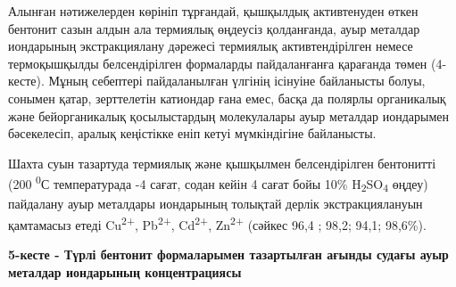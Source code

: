 Алынған нәтижелерден көрініп тұрғандай, қышқылдық активтенуден өткен
бентонит сазын алдын ала термиялық өңдеусіз қолданғанда, ауыр металдар
иондарының экстракциялану дәрежесі термиялық активтендірілген немесе
термоқышқылды белсендірілген формаларды пайдаланғанға қарағанда төмен
(4-кесте). Мұның себептері пайдаланылған үлгінің ісінуіне байланысты
болуы, сонымен қатар, зерттелетін катиондар ғана емес, басқа да полярлы
органикалық және бейорганикалық қосылыстардың молекулалары ауыр металдар
иондарымен бәсекелесіп, аралық кеңістікке еніп кетуі мүмкіндігіне
байланысты.

Шахта суын тазартуда термиялық және қышқылмен белсендірілген бентонитті
(200 \textsuperscript{0}С температурада -4 сағат, содан кейін 4 сағат
бойы 10\% H\textsubscript{2}SO\textsubscript{4} өңдеу) пайдалану ауыр
металдары иондарының толықтай дерлік экстракциялануын қамтамасыз етеді
Cu\textsuperscript{2+}, Pb\textsuperscript{2+}, Cd\textsuperscript{2+},
Zn\textsuperscript{2+} (сәйкес 96,4 ; 98,2; 94,1; 98,6\%).

\textbf{5-кесте - Түрлі бентонит формаларымен тазартылған ағынды судағы
ауыр металдар иондарының концентрациясы}

